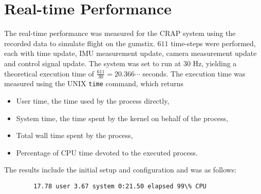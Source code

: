 \section{Real-time Performance}
\label{sec:results:realtime}
    The real-time performance was measured for the CRAP system using the
    recorded data to simulate flight on the gumstix.
    $611$ time-steps were performed, each with time update,
    IMU measurement update, camera measurement update and control signal update.
    The system was set to run at $30$ Hz, yielding a theoretical execution time of
    $\frac{611}{30} = 20.366\cdots $ seconds. The execution time was
    measured using the UNIX \texttt{time} command, which returns
    \begin{itemize}
        \item User time, the time used by the process directly,
        \item System time, the time spent by the kernel on behalf of the process,
        \item Total wall time spent by the process,
        \item Percentage of CPU time devoted to the executed process.
    \end{itemize}

    The results include the initial setup and configuration and was as follows:
    \begin{verbatim}
        17.78 user 3.67 system 0:21.50 elapsed 99\% CPU
    \end{verbatim}
